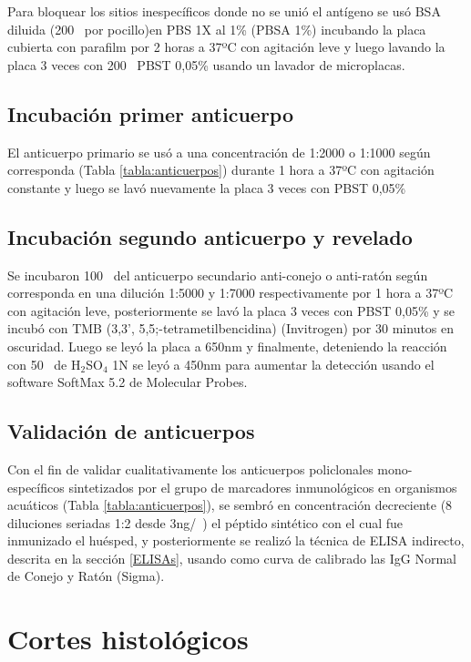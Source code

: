 \documentclass[12pt,letterpaper,oneside]{scrbook}
\newcommand{\subindice}[1]{$_{\text{#1}}$}
\begin{document}
Para bloquear los sitios inespecíficos donde no se unió el antígeno se
usó BSA diluida (200\si{\micro\litro} por pocillo)en PBS 1X al 1\% (PBSA
1\%) incubando la placa cubierta con parafilm por 2 horas a 37ºC con
agitación leve y luego lavando la placa 3 veces con 200\si{\micro\litro}
PBST 0,05\% usando un lavador de microplacas.

\subsection{Incubación primer anticuerpo}

El anticuerpo primario se usó a una concentración de 1:2000 o 1:1000
según corresponda (Tabla \ref{tabla:anticuerpos}) durante 1 hora a 37ºC
con agitación constante y luego se lavó nuevamente la placa 3 veces con
PBST 0,05\%

\subsection{Incubación segundo anticuerpo y revelado}

Se incubaron 100\si{\micro\litro} del anticuerpo secundario anti-conejo
o anti-ratón según corresponda en una dilución 1:5000 y 1:7000
respectivamente por 1 hora a 37ºC con agitación leve, posteriormente se
lavó la placa 3 veces con PBST 0,05\% y se incubó con TMB (3,3',
5,5;-tetrametilbencidina) (Invitrogen) por 30 minutos en oscuridad.
Luego se leyó la placa a 650nm y finalmente, deteniendo la reacción con
50\si{\micro\litro} de H\subindice{2}SO\subindice{4} 1N se leyó a 450nm
para aumentar la detección usando el software SoftMax 5.2 de Molecular
Probes.

\subsection{Validación de anticuerpos}

Con el fin de validar cualitativamente los anticuerpos policlonales
mono-específicos sintetizados por el grupo de marcadores inmunológicos
en organismos acuáticos (Tabla \ref{tabla:anticuerpos}), se sembró en
concentración decreciente (8 diluciones seriadas 1:2 desde
3ng/\si{\micro\litro}) el péptido sintético con el cual fue inmunizado
el huésped, y posteriormente se realizó la técnica de ELISA indirecto,
descrita en la sección \ref{ELISAs}, usando como curva de calibrado las
IgG Normal de Conejo y Ratón (Sigma).

\section{Cortes histológicos}
\end{document}
